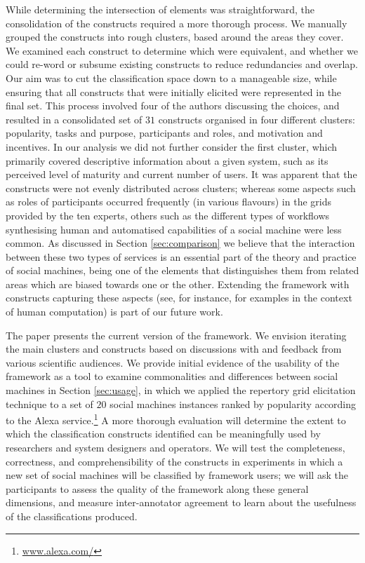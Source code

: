 \documentclass{sig-alternate}
\begin{document}
While determining the intersection of elements was straightforward, the consolidation of the
constructs required a more thorough process. We manually grouped the constructs into rough clusters, based around the areas they cover. We examined each construct to determine which were equivalent, and whether we could re-word or subsume existing constructs to reduce redundancies and overlap. Our aim was to cut the classification space down to a manageable size, while ensuring that all constructs that were initially elicited were represented in the final set. This process involved four of the authors discussing the choices, and resulted in a consolidated set of $31$ constructs organised in four different clusters: popularity, tasks and purpose, participants and roles, and motivation and incentives. In our analysis we did not further consider the first cluster, which primarily covered descriptive information about a given system, such as its perceived level of maturity and current number of users. It was apparent that the constructs were not evenly distributed across clusters; whereas some aspects such as roles of participants occurred frequently (in various flavours) in the grids provided by the ten experts, others such as the different types of workflows synthesising human and automatised capabilities of a social machine were less common. As discussed in Section \ref{sec:comparison} we believe that the interaction between these two types of services is an essential part of the theory and practice of social machines, being one of the elements that distinguishes them from related areas which are biased towards one or the other. Extending the framework with constructs capturing these aspects (see, for instance, \cite{quinn2011human} for examples in the context of human computation) is part of our future work.

The paper presents the current version of the framework. We envision iterating the main clusters and constructs based on discussions with and feedback from various scientific audiences. We provide initial evidence of the usability of the framework as a tool to examine commonalities and differences between social machines in Section \ref{sec:usage}, in which we applied the repertory grid elicitation technique to a set of $20$ social machines instances ranked by popularity according to the Alexa service.\footnote{\url{www.alexa.com/}} A more thorough evaluation will determine the extent to which the classification constructs identified can be meaningfully used by researchers and system designers and operators. We will test the completeness, correctness, and comprehensibility of the constructs in experiments in which a new set of social machines will be classified by framework users; we will ask the participants to assess the quality of the framework along these general dimensions, and measure inter-annotator agreement to learn about the usefulness of the classifications produced.
\end{document}
